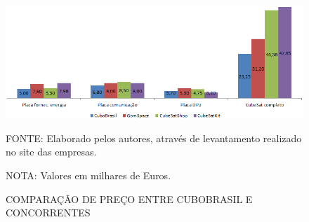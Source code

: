 \documentclass[
	12pt,				%
	openright,			%
	oneside,			%
	a4paper,			%
	english,			%
	french,				%
	spanish,			%
	brazil				%
	]{abntex2}
\begin{document}
	 \begin{figure}[th]
		\caption{COMPARAÇÃO DE PREÇO ENTRE CUBOBRASIL E CONCORRENTES}
		\centering
		\includegraphics[width=1.0\linewidth]{./figs/Grafico_01}
		
		\begin{small}
			FONTE: Elaborado pelos autores, através de levantamento realizado no site das empresas.
		\end{small}
		
		\begin{footnotesize}
			NOTA: Valores em milhares de Euros.
		\end{footnotesize}
	\end{figure}
\end{document}
